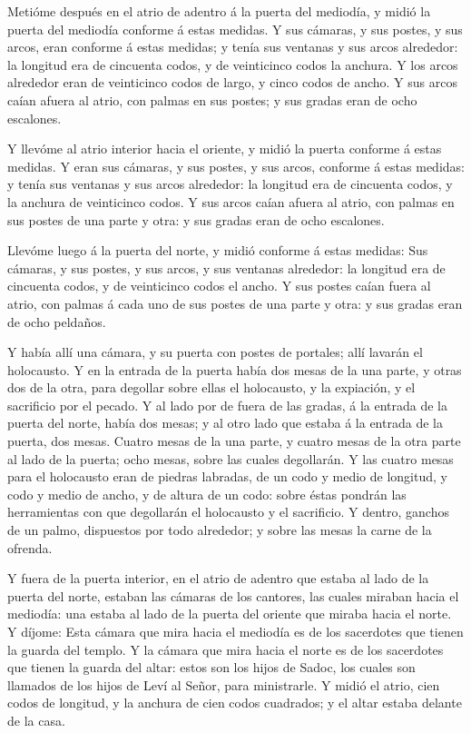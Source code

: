  Metióme después en el atrio de adentro á la puerta del
mediodía, y midió la puerta del mediodía conforme á estas medidas.
 Y sus cámaras, y sus postes, y sus arcos, eran conforme á
estas medidas; y tenía sus ventanas y sus arcos alrededor: la longitud
era de cincuenta codos, y de veinticinco codos la anchura. 
Y los arcos alrededor eran de veinticinco codos de largo, y cinco codos
de ancho.  Y sus arcos caían afuera al atrio, con palmas en
sus postes; y sus gradas eran de ocho escalones.

 Y llevóme al atrio interior hacia el oriente, y midió la
puerta conforme á estas medidas.  Y eran sus cámaras, y sus
postes, y sus arcos, conforme á estas medidas: y tenía sus ventanas y
sus arcos alrededor: la longitud era de cincuenta codos, y la anchura de
veinticinco codos.  Y sus arcos caían afuera al atrio, con
palmas en sus postes de una parte y otra: y sus gradas eran de ocho
escalones.

 Llevóme luego á la puerta del norte, y midió conforme á
estas medidas:  Sus cámaras, y sus postes, y sus arcos, y
sus ventanas alrededor: la longitud era de cincuenta codos, y de
veinticinco codos el ancho.  Y sus postes caían fuera al
atrio, con palmas á cada uno de sus postes de una parte y otra: y sus
gradas eran de ocho peldaños.

 Y había allí una cámara, y su puerta con postes de
portales; allí lavarán el holocausto.  Y en la entrada de
la puerta había dos mesas de la una parte, y otras dos de la otra, para
degollar sobre ellas el holocausto, y la expiación, y el sacrificio por
el pecado.  Y al lado por de fuera de las gradas, á la
entrada de la puerta del norte, había dos mesas; y al otro lado que
estaba á la entrada de la puerta, dos mesas.  Cuatro mesas
de la una parte, y cuatro mesas de la otra parte al lado de la puerta;
ocho mesas, sobre las cuales degollarán.  Y las cuatro
mesas para el holocausto eran de piedras labradas, de un codo y medio de
longitud, y codo y medio de ancho, y de altura de un codo: sobre éstas
pondrán las herramientas con que degollarán el holocausto y el
sacrificio.  Y dentro, ganchos de un palmo, dispuestos por
todo alrededor; y sobre las mesas la carne de la ofrenda.

 Y fuera de la puerta interior, en el atrio de adentro que
estaba al lado de la puerta del norte, estaban las cámaras de los
cantores, las cuales miraban hacia el mediodía: una estaba al lado de la
puerta del oriente que miraba hacia el norte.  Y díjome:
Esta cámara que mira hacia el mediodía es de los sacerdotes que tienen
la guarda del templo.  Y la cámara que mira hacia el norte
es de los sacerdotes que tienen la guarda del altar: estos son los hijos
de Sadoc, los cuales son llamados de los hijos de Leví al Señor, para
ministrarle.  Y midió el atrio, cien codos de longitud, y
la anchura de cien codos cuadrados; y el altar estaba delante de la
casa.

